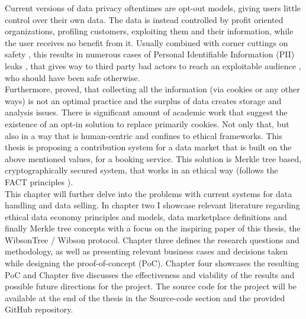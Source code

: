 \documentclass[a4paper,11pt]{report} %
\theoremstyle{change}
\theoremstyle{theoremstyle}
\begin{document}
Current versions of data privacy oftentimes are opt-out models, giving users little control over their own data. The data is instead controlled by profit oriented organizations, profiling customers, exploiting them and their information, while the user receives no benefit from it. Usually combined with corner cuttings on safety \cite{vagle2020cybersecurity}\cite{kopp2017cyber}\cite{zhang2023market}, this results in numerous cases of Personal Identifiable Information (PII) leaks \cite{dao2021alternative}, that gives way to third party bad actors to reach an exploitable audience \cite{langvardt2024media}\cite{cross2025examining}, who should have been safe otherwise.\\
Furthermore, \cite{chen2023studying} proved, that collecting all the information (via cookies or any other ways) is not an optimal practice and the surplus of data creates storage and analysis issues.
There is significant amount of academic work that suggest the existence of an opt-in solution to replace primarily cookies. Not only that, but also in a way that is human-centric and confines to ethical frameworks.
This thesis is proposing a contribution system for a data market that is built on the above mentioned values, for a booking service.
This solution is Merkle tree based, cryptographically secured system, that works in an ethical way (follows the FACT principles \cite{sohail2024data}).\\
This chapter will further delve into the problems with current systems for data handling and data selling. In chapter two I showcase relevant literature regarding ethical data economy principles and models, data marketplace definitions and finally Merkle tree concepts with a focus on the inspiring paper of this thesis, the WibsonTree / Wibson protocol. Chapter three defines the research questions and methodology, as well as presenting relevant business cases and decisions taken while designing the proof-of-concept (PoC). Chapter four showcases the resulting PoC and Chapter five discusses the effectiveness and viability of the results and possible future directions for the project. The source code for the project will be available at the end of the thesis in the Source-code section and the provided GitHub repository.
\end{document}
